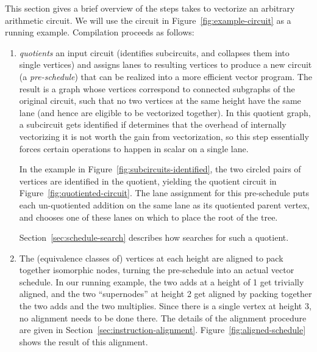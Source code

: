 This section gives a brief overview of the steps \system takes to vectorize an arbitrary arithmetic circuit.
We will use the circuit in Figure~\ref{fig:example-circuit} as a running example.
Compilation proceeds as follows:
\begin{enumerate}
    \item \system \textit{quotients} an input circuit (identifies subcircuits, and collapses them into single vertices) and assigns lanes to resulting vertices to produce a new circuit (a {\em pre-schedule}) that can be realized into a more efficient vector program. The result is a graph whose vertices correspond to connected subgraphs of the original circuit, such that no two vertices at the same height have the same lane (and hence are eligible to be vectorized together). In this quotient graph, a subcircuit gets identified if \system determines that the overhead of internally vectorizing it is not worth the gain from vectorization, so this step essentially forces certain operations to happen in scalar on a single lane. %
    
    In the example in Figure~\ref{fig:subcircuits-identified}, the two circled pairs of vertices are identified in the quotient, yielding the quotient circuit in Figure~\ref{fig:quotiented-circuit}.
    The lane assignment for this pre-schedule puts each un-quotiented addition on the same lane as its quotiented parent vertex, and chooses one of these lanes on which to place the root of the tree.

    Section~\ref{sec:schedule-search} describes how \system searches for such a quotient. 
    
    \item The (equivalence classes of) vertices at each height are aligned to pack together isomorphic nodes, turning the pre-schedule into an actual vector schedule. 
    In our running example, the two adds at a height of 1 get trivially aligned, and the two ``supernodes'' at height 2 get aligned by packing together the two adds and the two multiplies.
    Since there is a single vertex at height 3, no alignment needs to be done there. 
    The details of the alignment procedure are given in Section~\ref{sec:instruction-alignment}.
    Figure~\ref{fig:aligned-schedule} shows the result of this alignment.
    

\end{enumerate}
